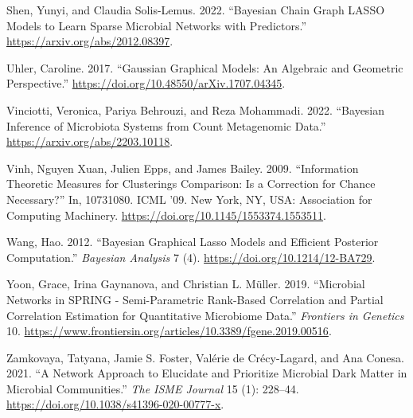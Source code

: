 \documentclass[
  a4paper,
]{article}
\newlength{\cslhangindent}
\newlength{\cslentryspacingunit} %
\newenvironment{CSLReferences}[2] %
 {%
  \setlength{\parindent}{0pt}
  \ifodd #1
  \let\oldpar\par
  \def\par{\hangindent=\cslhangindent\oldpar}
  \fi
  \setlength{\parskip}{#2\cslentryspacingunit}
 }%
 {}
\begin{document}
\begin{CSLReferences}{1}{0}
\leavevmode{}%
Shen, Yunyi, and Claudia Solis-Lemus. 2022. {``Bayesian Chain Graph
LASSO Models to Learn Sparse Microbial Networks with Predictors.''}
\url{https://arxiv.org/abs/2012.08397}.

\leavevmode{}%
Uhler, Caroline. 2017. {``Gaussian Graphical Models: An Algebraic and
Geometric Perspective.''}
\url{https://doi.org/10.48550/arXiv.1707.04345}.

\leavevmode{}%
Vinciotti, Veronica, Pariya Behrouzi, and Reza Mohammadi. 2022.
{``Bayesian Inference of Microbiota Systems from Count Metagenomic
Data.''} \url{https://arxiv.org/abs/2203.10118}.

\leavevmode{}%
Vinh, Nguyen Xuan, Julien Epps, and James Bailey. 2009. {``Information
Theoretic Measures for Clusterings Comparison: Is a Correction for
Chance Necessary?''} In, 10731080. ICML '09. New York, NY, USA:
Association for Computing Machinery.
\url{https://doi.org/10.1145/1553374.1553511}.

\leavevmode{}%
Wang, Hao. 2012. {``Bayesian Graphical Lasso Models and Efficient
Posterior Computation.''} \emph{Bayesian Analysis} 7 (4).
\url{https://doi.org/10.1214/12-BA729}.

\leavevmode{}%
Yoon, Grace, Irina Gaynanova, and Christian L. Müller. 2019.
{``Microbial Networks in SPRING - Semi-Parametric Rank-Based Correlation
and Partial Correlation Estimation for Quantitative Microbiome Data.''}
\emph{Frontiers in Genetics} 10.
\url{https://www.frontiersin.org/articles/10.3389/fgene.2019.00516}.

\leavevmode{}%
Zamkovaya, Tatyana, Jamie S. Foster, Valérie de Crécy-Lagard, and Ana
Conesa. 2021. {``A Network Approach to Elucidate and Prioritize
Microbial Dark Matter in Microbial Communities.''} \emph{The ISME
Journal} 15 (1): 228--44.
\url{https://doi.org/10.1038/s41396-020-00777-x}.

\end{CSLReferences}
\end{document}
